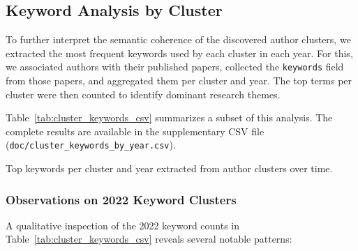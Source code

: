 \documentclass[10pt,a4paper]{article}
\begin{document}
\subsection{Keyword Analysis by Cluster}

To further interpret the semantic coherence of the discovered author clusters, we extracted the most frequent keywords used by each cluster in each year. For this, we associated authors with their published papers, collected the \texttt{keywords} field from those papers, and aggregated them per cluster and year. The top terms per cluster were then counted to identify dominant research themes.

Table~\ref{tab:cluster_keywords_csv} summarizes a subset of this analysis. The complete results are available in the supplementary CSV file (\texttt{doc/cluster\_keywords\_by\_year.csv}).

\begin{table}[H]
\centering
\scriptsize
{}
\caption{Top keywords per cluster and year extracted from author clusters over time.}
\label{tab:cluster_keywords_csv}
\end{table}

\subsubsection*{Observations on 2022 Keyword Clusters}

\noindent A qualitative inspection of the 2022 keyword counts in Table~\ref{tab:cluster_keywords_csv} reveals several notable patterns:
\end{document}
